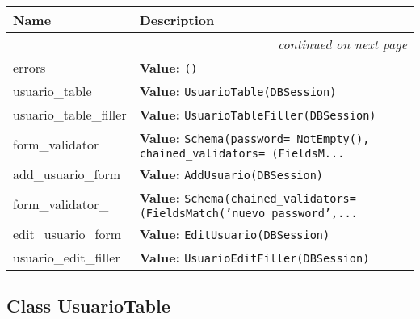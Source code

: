     \vspace{-1cm}
\hspace{\varindent}\begin{longtable}{|p{\varnamewidth}|p{\vardescrwidth}|l}
\cline{1-2}
\cline{1-2} \centering \textbf{Name} & \centering \textbf{Description}& \\
\cline{1-2}
\endhead\cline{1-2}\multicolumn{3}{r}{\small\textit{continued on next page}}\\\endfoot\cline{1-2}
\endlastfoot\raggedright e\-r\-r\-o\-r\-s\- & \raggedright \textbf{Value:} 
{\tt ()}&\\
\cline{1-2}
\raggedright u\-s\-u\-a\-r\-i\-o\-\_\-t\-a\-b\-l\-e\- & \raggedright \textbf{Value:} 
{\tt UsuarioTable(DBSession)}&\\
\cline{1-2}
\raggedright u\-s\-u\-a\-r\-i\-o\-\_\-t\-a\-b\-l\-e\-\_\-f\-i\-l\-l\-e\-r\- & \raggedright \textbf{Value:} 
{\tt UsuarioTableFiller(DBSession)}&\\
\cline{1-2}
\raggedright f\-o\-r\-m\-\_\-v\-a\-l\-i\-d\-a\-t\-o\-r\- & \raggedright \textbf{Value:} 
{\tt Schema(password= NotEmpty(), chained\_validators= (FieldsM\texttt{...}}&\\
\cline{1-2}
\raggedright a\-d\-d\-\_\-u\-s\-u\-a\-r\-i\-o\-\_\-f\-o\-r\-m\- & \raggedright \textbf{Value:} 
{\tt AddUsuario(DBSession)}&\\
\cline{1-2}
\raggedright f\-o\-r\-m\-\_\-v\-a\-l\-i\-d\-a\-t\-o\-r\-\_\-2\- & \raggedright \textbf{Value:} 
{\tt Schema(chained\_validators= (FieldsMatch('nuevo\_password',\texttt{...}}&\\
\cline{1-2}
\raggedright e\-d\-i\-t\-\_\-u\-s\-u\-a\-r\-i\-o\-\_\-f\-o\-r\-m\- & \raggedright \textbf{Value:} 
{\tt EditUsuario(DBSession)}&\\
\cline{1-2}
\raggedright u\-s\-u\-a\-r\-i\-o\-\_\-e\-d\-i\-t\-\_\-f\-i\-l\-l\-e\-r\- & \raggedright \textbf{Value:} 
{\tt UsuarioEditFiller(DBSession)}&\\
\cline{1-2}
\end{longtable}



\subsection{Class UsuarioTable}

